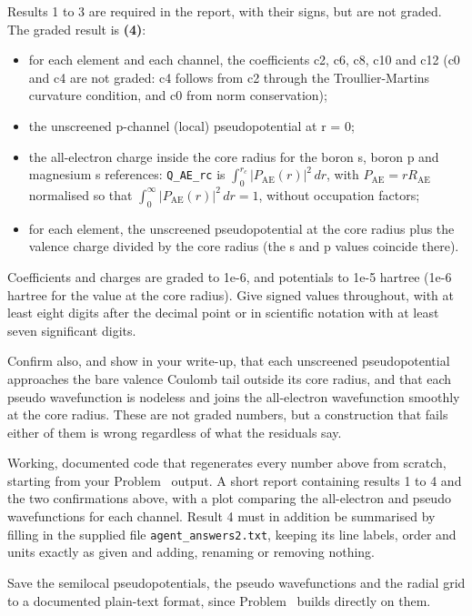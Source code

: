 Results 1 to 3 are required in the report, with their signs, but are not graded. The graded result is
\textbf{(4)}:
\begin{itemize}[leftmargin=13pt,itemsep=1pt,topsep=2pt]
\item for each element and each channel, the coefficients c2, c6, c8, c10 and c12 (c0 and c4 are not graded: c4 follows from c2 through the Troullier-Martins curvature condition, and c0 from norm conservation);
\item the unscreened
      p-channel (local) pseudopotential at r = 0;
\item the all-electron charge inside the core radius for the boron s, boron p and magnesium s references:
      \texttt{Q\_AE\_rc} is $\int_0^{r_c}|P_{\mathrm{AE}}(r)|^2\,dr$, with
      $P_{\mathrm{AE}}=rR_{\mathrm{AE}}$ normalised so that $\int_0^\infty|P_{\mathrm{AE}}(r)|^2\,dr=1$,
      without occupation factors;
\item for each element, the unscreened pseudopotential at the core radius plus the valence charge divided by
      the core radius (the s and p values coincide there).
\end{itemize}

Coefficients and charges are graded to 1e-6, and potentials to 1e-5 hartree (1e-6 hartree for the value at the
core radius). Give signed values throughout, with at
least eight digits after the decimal point or in scientific notation with at least seven significant digits.

Confirm also, and show in your write-up, that each unscreened pseudopotential approaches the bare valence
Coulomb tail outside its core radius, and that each pseudo wavefunction is nodeless and joins the
all-electron wavefunction smoothly at the core radius. These are not graded numbers, but a construction that
fails either of them is wrong regardless of what the residuals say.


Working, documented code that regenerates every number above from scratch, starting from your Problem~
output. A short report containing results 1 to 4 and the two confirmations above, with a plot comparing the
all-electron and pseudo wavefunctions for each channel. Result 4 must in addition be summarised by
filling in the supplied file \texttt{agent\_answers2.txt}, keeping its line labels, order and units exactly as
given and adding, renaming or removing nothing.

Save the semilocal pseudopotentials, the pseudo wavefunctions and the radial grid to a documented plain-text
format, since Problem~ builds directly on them.

